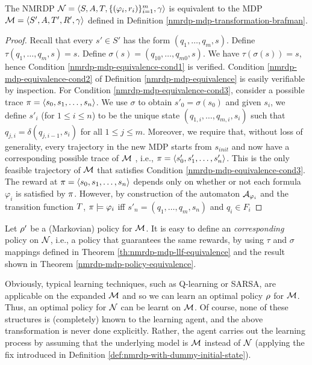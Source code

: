 \begin{theorem}\label{th:nmrdp-mdp-llf-equivalence}
	The NMRDP $\mathcal{N}= \langle S, A, T, \{(\varphi_i,r_i)\}_{i=1}^{m}, \gamma \rangle$ is equivalent to the  MDP $\mathcal{M}= \langle S',A,T',R', \gamma \rangle$ defined in Definition \ref{nmrdp-mdp-transformation-brafman}.
\end{theorem}
\begin{proof}
	Recall that every $s' \in S'$ has the form $(q_1 ,\dots, q_m , s)$.
	Define $\tau(q_1 ,\dots, q_m, s) = s$. Define $\sigma(s) = (q_{10} ,\dots, q_{m0}, s)$.
	We have $\tau(\sigma(s)) = s$, hence Condition \ref{nmrdp-mdp-equivalence-cond1} is verified. Condition \ref{nmrdp-mdp-equivalence-cond2} of Definition \ref{nmrdp-mdp-equivalence} is easily verifiable by inspection. For Condition \ref{nmrdp-mdp-equivalence-cond3}, consider a possible trace
	$\pi = \langle s_0, s_1, \dots, s_n \rangle$. We use $\sigma$ to obtain $s'_0 = \sigma(s_0)$
	and given $s_i$, we define $s'_i$ (for $1 \le i \le n$) to be the unique
	state $(q_{1,i} ,\dots, q_{m,i} , s_i)$ such that $q_{j,i} = \delta(q_{j,i-1}, s_i )$ for all
	$1 \le j \le m$. Moreover, we require that, without loss of generality, every trajectory in the new MDP starts from $s_{init}$ and  now have a corresponding possible trace of
	$\mathcal{M}$ , i.e., $\pi = \langle s'_0, s'_1, \dots, s'_n \rangle$. This is the only feasible trajectory of $\mathcal{M}$ that satisfies Condition \ref{nmrdp-mdp-equivalence-cond3}. The reward at
	$\pi = \langle s_0, s_1, \dots, s_n \rangle$ depends only on whether or not
	each formula $\varphi_i$ is satisfied by $\pi$. However, by construction
	of the automaton $\mathcal{A}_{\varphi_i}$ and the transition function $T$, $\pi \models \varphi_i$
	iff $s'_{n} = (q_1 ,\dots, q_m, s_n)$ and $q_i \in F_i$
\end{proof}


Let $\rho'$ be a (Markovian) policy for $\mathcal{M}$. It is easy to define an \emph{corresponding} policy on $\mathcal{N}$, i.e., a policy that guarantees the same rewards, by using $\tau$ and $\sigma$ mappings defined in Theorem \ref{th:nmrdp-mdp-llf-equivalence} and the result shown in Theorem \ref{nmrdp-mdp-policy-equivalence}.

Obviously, typical learning techniques, such as Q-learning
or SARSA,  are applicable on the expanded
$\mathcal{M}$ and
so we can learn an optimal policy $\rho$ for $\mathcal{M}$. 
Thus, an optimal policy for $\mathcal{N}$ can be learnt on $\mathcal{M}$. 
Of course, none of these structures is (completely) 
known to the learning agent, and the above transformation is 
never done explicitly. Rather, the agent carries out the learning process
by assuming that the underlying model is $\mathcal{M}$ instead of $\mathcal{N}$ (applying the fix introduced in Definition \ref{def:nmrdp-with-dummy-initial-state}).



